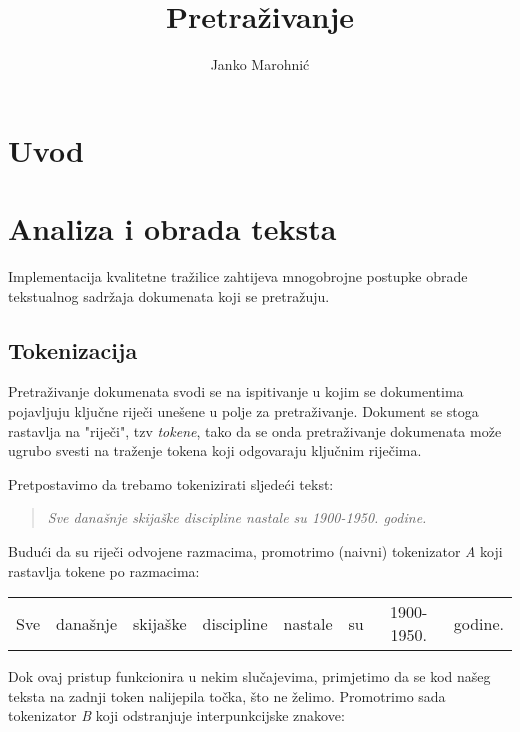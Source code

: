 \documentclass[11pt]{scrreprt}
\title{Pretraživanje}
\author{Janko Marohnić}
\begin{document}
\maketitle


\tableofcontents

\pagebreak


\chapter{Uvod}

\chapter{Analiza i obrada teksta}

Implementacija kvalitetne tražilice zahtijeva mnogobrojne postupke obrade tekstualnog sadržaja dokumenata koji se pretražuju.

\section{Tokenizacija}

Pretraživanje dokumenata svodi se na ispitivanje u kojim se dokumentima pojavljuju ključne riječi unešene u polje za pretraživanje. Dokument se stoga rastavlja na "riječi", tzv \textit{tokene}, tako da se onda pretraživanje dokumenata može ugrubo svesti na traženje tokena koji odgovaraju ključnim riječima.

Pretpostavimo da trebamo tokenizirati sljedeći tekst:

\begin{quote}
  \textit{Sve današnje skijaške discipline nastale su 1900-1950. godine.}
\end{quote}

Budući da su riječi odvojene razmacima, promotrimo (naivni) tokenizator \textit{A} koji rastavlja tokene po razmacima:

\begin{center}
  \begin{tabular}{cccccccc}
    Sve & današnje & skijaške & discipline & nastale & su & 1900-1950. & godine.
  \end{tabular}
\end{center}

Dok ovaj pristup funkcionira u nekim slučajevima, primjetimo da se kod našeg teksta na zadnji token nalijepila točka, što ne želimo. Promotrimo sada tokenizator \textit{B} koji odstranjuje interpunkcijske znakove:
\end{document}
